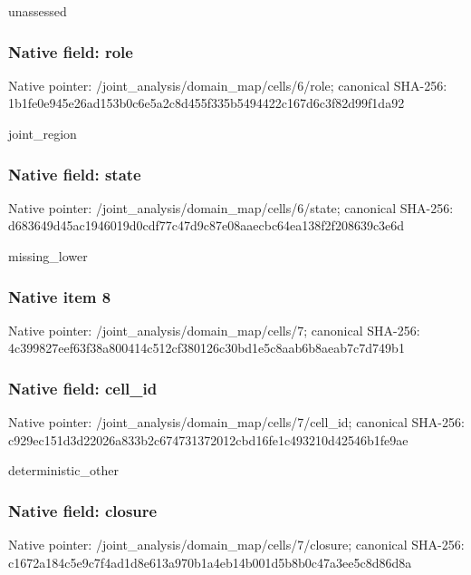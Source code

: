 \documentclass[10pt,a4paper]{article}
\begin{document}
\begingroup\raggedright\sloppy unassessed\par\endgroup

\subsubsection{Native field: role}
Native pointer: /joint\_\allowbreak{}analysis/domain\_\allowbreak{}map/cells/6/role; canonical SHA-256: 1b1fe0e945e26ad153b0c6e5a2c8d455f335b5494422c167d6c3f82d99f1da92

\begingroup\raggedright\sloppy joint\_\allowbreak{}region\par\endgroup

\subsubsection{Native field: state}
Native pointer: /joint\_\allowbreak{}analysis/domain\_\allowbreak{}map/cells/6/state; canonical SHA-256: d683649d45ac1946019d0cdf77c47d9c87e08aaecbc64ea138f2f208639c3e6d

\begingroup\raggedright\sloppy missing\_\allowbreak{}lower\par\endgroup

\subsubsection{Native item 8}
Native pointer: /joint\_\allowbreak{}analysis/domain\_\allowbreak{}map/cells/7; canonical SHA-256: 4c399827eef63f38a800414c512cf380126c30bd1e5c8aab6b8aeab7c7d749b1

\subsubsection{Native field: cell\_\allowbreak{}id}
Native pointer: /joint\_\allowbreak{}analysis/domain\_\allowbreak{}map/cells/7/cell\_\allowbreak{}id; canonical SHA-256: c929ec151d3d22026a833b2c674731372012cbd16fe1c493210d42546b1fe9ae

\begingroup\raggedright\sloppy deterministic\_\allowbreak{}other\par\endgroup

\subsubsection{Native field: closure}
Native pointer: /joint\_\allowbreak{}analysis/domain\_\allowbreak{}map/cells/7/closure; canonical SHA-256: c1672a184c5e9c7f4ad1d8e613a970b1a4eb14b001d5b8b0c47a3ee5c8d86d8a
\end{document}
